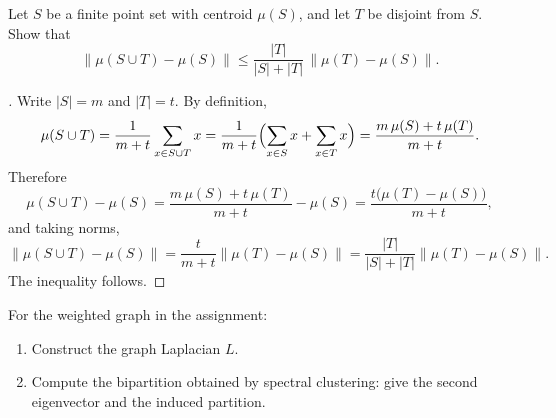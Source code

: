 \documentclass[en,hazy,blue,12pt,normal]{../../elegantnote}
\begin{document}
\begin{homework}
Let $S$ be a finite point set with centroid $\mu(S)$, and let $T$ be disjoint from $S$. Show that
\[
\bigl\|\mu(S\cup T)-\mu(S)\bigr\|\le \frac{|T|}{|S|+|T|}\,\bigl\|\mu(T)-\mu(S)\bigr\|.
\]
\end{homework}

\begin{proof}[\solutionname]
Write $|S|=m$ and $|T|=t$. By definition,
\[
\mu(S\cup T)=\frac{1}{m+t}\sum_{x\in S\cup T} x=\frac{1}{m+t}\Bigl(\sum_{x\in S}x+\sum_{x\in T}x\Bigr)=\frac{m\,\mu(S)+t\,\mu(T)}{m+t}.
\]
Therefore
\[
\mu(S\cup T)-\mu(S)=\frac{m\,\mu(S)+t\,\mu(T)}{m+t}-\mu(S)=\frac{t\bigl(\mu(T)-\mu(S)\bigr)}{m+t},
\]
and taking norms,
\[
\bigl\|\mu(S\cup T)-\mu(S)\bigr\|=\frac{t}{m+t}\bigl\|\mu(T)-\mu(S)\bigr\|=\frac{|T|}{|S|+|T|}\bigl\|\mu(T)-\mu(S)\bigr\|.
\]
The inequality follows.
\end{proof}

\begin{homework}
For the weighted graph in the assignment:
\begin{enumerate}
    \item[(5.a)] Construct the graph Laplacian $L$.
    \item[(5.b)] Compute the bipartition obtained by spectral clustering: give the second eigenvector and the induced partition.
\end{enumerate}
\end{homework}
\end{document}
